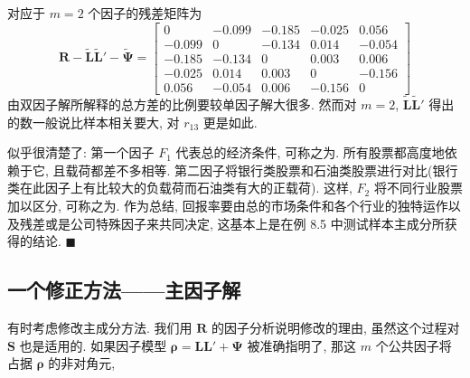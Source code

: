 对应于 $m=2$ 个因子的残差矩阵为
\[
\mathbf{R}-\tilde{\mathbf{L}}\tilde{\mathbf{L}}'-\tilde{\boldsymbol{\Psi}}=\begin{bmatrix}
0&-0.099&-0.185&-0.025&0.056\\
-0.099&0&-0.134&0.014&-0.054\\
-0.185&-0.134&0&0.003&0.006\\
-0.025&0.014&0.003&0&-0.156\\
0.056&-0.054&0.006&-0.156&0
\end{bmatrix}
\]
由双因子解所解释的总方差的比例要较单因子解大很多. 然而对 $m=2$, $\tilde{\mathbf{L}}\tilde{\mathbf{L}}'$ 得出的数一般说比样本相关要大, 对 $r_{13}$ 更是如此.

似乎很清楚了: 第一个因子 $F_1$ 代表总的经济条件, 可称之为. 所有股票都高度地依赖于它, 且载荷都差不多相等. 第二因子将银行类股票和石油类股票进行对比(银行类在此因子上有比较大的负载荷而石油类有大的正载荷). 这样, $F_2$ 将不同行业股票加以区分, 可称之为. 作为总结, 回报率要由总的市场条件和各个行业的独特运作以及残差或是公司特殊因子来共同决定, 这基本上是在例 8.5 中测试样本主成分所获得的结论. \hfill$\blacksquare$

\subsection{一个修正方法——主因子解}

有时考虑修改主成分方法. 我们用 $\mathbf{R}$ 的因子分析说明修改的理由, 虽然这个过程对 $\mathbf{S}$ 也是适用的. 如果因子模型 $\boldsymbol{\rho}=\mathbf{L}\mathbf{L}'+\boldsymbol{\Psi}$ 被准确指明了, 那这 $m$ 个公共因子将占据 $\boldsymbol{\rho}$ 的非对角元,
